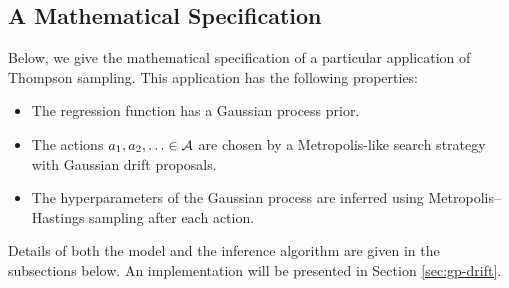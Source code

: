 \subsection{A Mathematical Specification}\label{sec:math-spec}
Below, we give the mathematical specification of a particular application of
Thompson sampling.  This application has the following properties:
\begin{itemize}
  \item The regression function has a Gaussian process prior.
  \item The actions $a_1,a_2,\ldots \in \mathcal{A}$ are chosen by a Metropolis-like search
    strategy with Gaussian drift proposals.
  \item The hyperparameters of the Gaussian process are inferred using
    Metropolis--Hastings sampling after each action.
\end{itemize}
Details of both the model and the inference algorithm are given in the
subsections below.  An implementation will be presented in Section
\ref{sec:gp-drift}.

